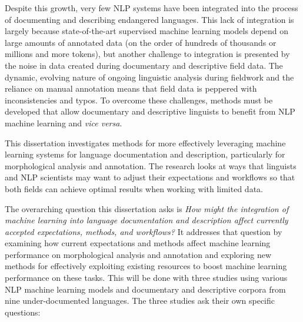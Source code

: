 Despite this growth, very few NLP systems have been integrated into the process of documenting and describing endangered languages. This lack of integration is largely because state-of-the-art supervised machine learning models depend on large amounts of annotated data (on the order of hundreds of thousands or millions and more tokens), but another challenge to integration is presented by the noise in data created during documentary and descriptive field data. The dynamic, evolving nature of ongoing linguistic analysis during fieldwork and the reliance on manual annotation means that field data is peppered with inconsistencies and typos. To overcome these challenges, methods must be developed that allow documentary and descriptive linguists to benefit from NLP machine learning and \textit{vice versa}.

This dissertation investigates methods for more effectively leveraging machine learning systems for language documentation and description, particularly for morphological analysis and annotation. The research looks at ways that linguists and NLP scientists may want to adjust their expectations and workflows so that both fields can achieve optimal results when working with limited data. 


The overarching question this dissertation asks is \emph{How might the integration of machine learning into language documentation and description affect currently accepted expectations, methods, and workflows?} It addresses that question by examining how current expectations and methods affect machine learning performance on morphological analysis and annotation and exploring new methods for effectively exploiting existing resources to boost machine learning performance on these tasks. This will be done with three studies using various NLP machine learning models and documentary and descriptive corpora from nine under-documented languages. The three studies ask their own specific questions:

